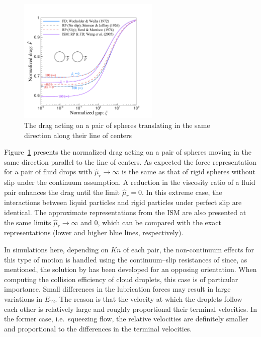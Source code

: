 \documentclass[../thesis.tex]{subfiles}
\begin{document}
\begin{figure}%
\center
\includegraphics[trim=05mm 00mm 20mm 15mm, clip, width=0.6\textwidth]{../figs/PRF/fig5.pdf}
\caption{The drag acting on a pair of spheres translating in the same direction along their line of centers}
\label{fig:modelssame}
\end{figure}%
Figure~\ref{fig:modelssame} presents the normalized drag acting on a pair of spheres moving in the same direction parallel to the line of centers. As expected the force representation for a pair of fluid drops with $\hat{\mu}_r\to\infty$ is the same as that of rigid spheres without slip under the continuum assumption. A reduction in the viscosity ratio of a fluid pair enhances the drag until the limit $\hat{\mu}_r=0$. In this extreme case, the interactions between liquid particles and rigid particles under perfect slip are identical. The approximate representations from the ISM are also presented at the same limits $\hat{\mu}_r\to\infty$ and $0$, which can be compared with the exact representations (lower and higher blue lines, respectively).

In simulations here, depending on $Kn$ of each pair, the non-continuum effects for this type of motion is handled using the continuum--slip resistances of \cite{RM74} since, as mentioned, the solution by \cite{DRK21a} has been developed for an opposing orientation. When computing the collision efficiency of cloud droplets, this case is of particular importance. Small differences in the lubrication forces may result in large variations in $E_{12}$. The reason is that the velocity at which the droplets follow each other is relatively large and roughly proportional their terminal velocities. In the former case, i.e.\ squeezing flow, the relative velocities are definitely smaller and proportional to the differences in the terminal velocities.
\end{document}
